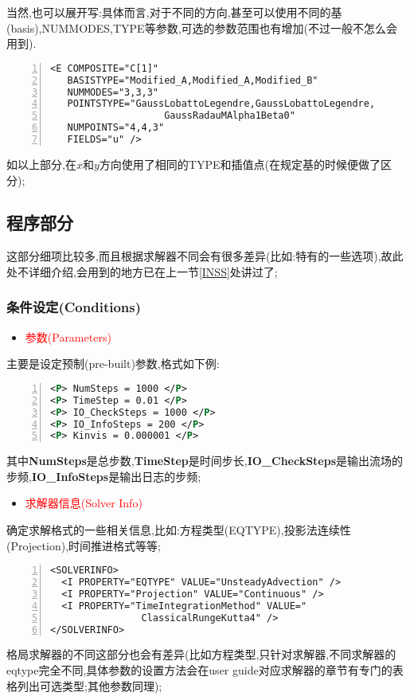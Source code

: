 当然,也可以展开写:具体而言,对于不同的方向,甚至可以使用不同的基(basis),NUMMODES,TYPE等参数,可选的参数范围也有增加(不过一般不怎么会用到).
\begin{lstlisting}[frame=single,numbers=left]
<E COMPOSITE="C[1]"
   BASISTYPE="Modified_A,Modified_A,Modified_B"
   NUMMODES="3,3,3"
   POINTSTYPE="GaussLobattoLegendre,GaussLobattoLegendre,
   		   		    GaussRadauMAlpha1Beta0"
   NUMPOINTS="4,4,3"
   FIELDS="u" />
\end{lstlisting}
\par
如以上部分,在$x$和$y$方向使用了相同的TYPE和插值点(在规定基的时候便做了区分);


\subsection{程序部分} \label{xmlprog}
这部分细项比较多,而且根据求解器不同会有很多差异(比如:特有的一些选项),故此处不详细介绍,会用到的地方已在上一节\ref{INSS}处讲过了;

\subsubsection{条件设定(Conditions)}

\begin{itemize}
\item{\textcolor{red}{参数(Parameters)}}
\end{itemize}
\par
主要是设定预制(pre-built)参数,格式如下例:
\begin{lstlisting}[frame=single,numbers=left,language=XML]
<P> NumSteps = 1000 </P>
<P> TimeStep = 0.01 </P>
<P> IO_CheckSteps = 1000 </P>
<P> IO_InfoSteps = 200 </P>
<P> Kinvis = 0.000001 </P>
\end{lstlisting}
\par
其中\textbf{NumSteps}是总步数,\textbf{TimeStep}是时间步长,\textbf{IO\_CheckSteps}是输出流场的步频,\textbf{IO\_InfoSteps}是输出日志的步频;

\begin{itemize}
	\item{\textcolor{red}{求解器信息(Solver Info)}}
\end{itemize}
\par
确定求解格式的一些相关信息,比如:方程类型(EQTYPE),投影法连续性(Projection),时间推进格式等等;
\begin{lstlisting}[frame=single,numbers=left]
<SOLVERINFO>
  <I PROPERTY="EQTYPE" VALUE="UnsteadyAdvection" />
  <I PROPERTY="Projection" VALUE="Continuous" />
  <I PROPERTY="TimeIntegrationMethod" VALUE="
  				ClassicalRungeKutta4" />
</SOLVERINFO>

\end{lstlisting}
\par
格局求解器的不同这部分也会有差异(比如方程类型,只针对求解器,不同求解器的eqtype完全不同,具体参数的设置方法会在user guide对应求解器的章节有专门的表格列出可选类型;其他参数同理);

